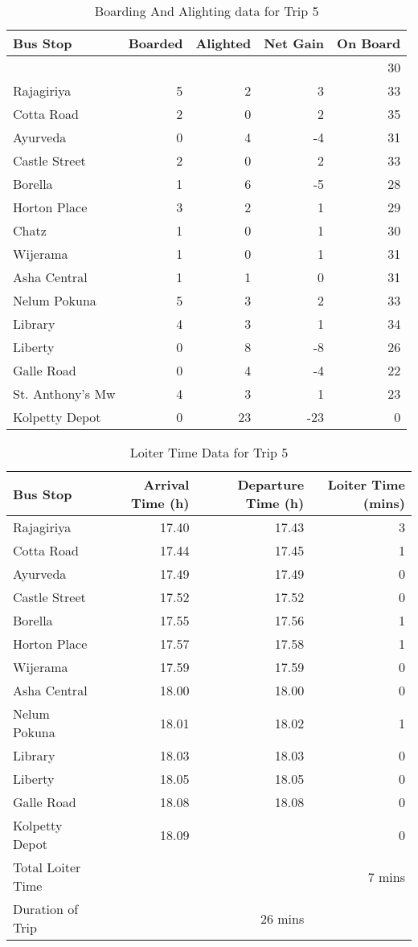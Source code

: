 \begin{table}
\centering
\begin{tabular}{|l|r|r|r|r|}
\hline
Bus Stop & Boarded & Alighted & Net Gain & On Board \\
\hline
 & & & & 30 \\
Rajagiriya	&5	&2	&3	&33\\
Cotta Road	&2	&0	&2	&35\\
Ayurveda	&0	&4	&-4	&31\\
Castle Street	&2	&0	&2	&33\\
Borella	&1	&6	&-5	&28\\
Horton Place	&3	&2	&1	&29\\
\rowcolor[gray]{0.7}
Chatz	&1	&0	&1	&30\\
Wijerama	&1	&0	&1	&31\\
Asha Central	&1	&1	&0	&31\\
Nelum Pokuna	&5	&3	&2	&33\\
Library	&4	&3	&1	&34\\
Liberty	&0	&8	&-8	&26\\
Galle Road	&0	&4	&-4	&22\\
\rowcolor[gray]{0.7}
St. Anthony's Mw	&4	&3	&1	&23\\
Kolpetty Depot	&0	&23	&-23	&0\\
\hline
\end{tabular}
\caption{Boarding And Alighting data for Trip 5}
\label{table-trip5-BoardingAndAlighting}
\end{table}

\begin{table}
\centering
\begin{tabular}{|l|r|r|r|}
\hline
Bus Stop & Arrival Time (h) & Departure Time (h) & Loiter Time (mins) \\
\hline
Rajagiriya	&17.40	&17.43	&3\\
Cotta Road	&17.44	&17.45	&1\\
Ayurveda	&17.49	&17.49	&0\\
Castle Street	&17.52	&17.52	&0\\
Borella	&17.55	&17.56	&1\\
Horton Place	&17.57	&17.58	&1\\
Wijerama	&17.59	&17.59	&0\\
Asha Central	&18.00	&18.00	&0\\
Nelum Pokuna	&18.01	&18.02	&1\\
Library	&18.03	&18.03	&0\\
Liberty	&18.05	&18.05	&0\\
Galle Road	&18.08	&18.08	&0\\
Kolpetty Depot	&18.09	&	&0\\
\hline
Total Loiter Time & & & 7 mins \\
Duration of Trip & & 26 mins & \\
\hline
\end{tabular}
\caption{Loiter Time Data for Trip 5}
\label{table-trip5-LoiterTime}
\end{table}